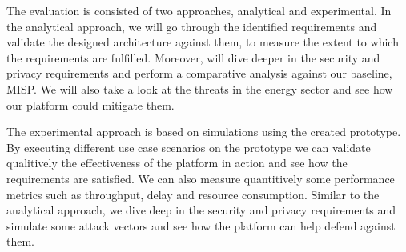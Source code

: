 \documentclass{article}
\begin{document}

The evaluation is consisted of two approaches, analytical and experimental. In the analytical approach, we will go through the identified requirements and validate the designed architecture against them, to measure the extent to which the requirements are fulfilled. Moreover, will dive deeper in the security and privacy requirements and perform a comparative analysis against our baseline, MISP. We will also take a look at the threats in the energy sector and see how our platform could mitigate them.

The experimental approach is based on simulations using the created prototype. By executing different use case scenarios on the prototype we can validate qualitively the effectiveness of the platform in action and see how the requirements are satisfied. We can also measure quantitively some performance metrics such as throughput, delay and resource consumption. Similar to the analytical approach, we dive deep in the security and privacy requirements and simulate some attack vectors and see how the platform can help defend against them.


\end{document}
